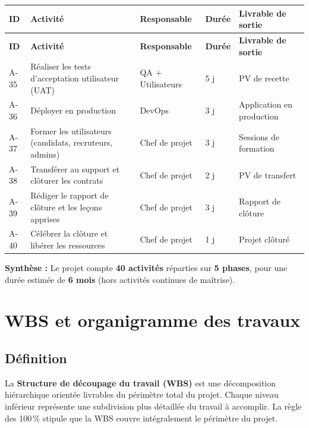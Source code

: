 \documentclass[11pt,a4paper]{article}
\begin{document}
\begin{longtable}{|p{1.2cm}|p{5.5cm}|p{2.2cm}|p{2cm}|p{2.5cm}|}
    \hline
    \rowcolor{ifrigray}
    \textbf{ID} & \textbf{Activité} & \textbf{Responsable} & \textbf{Durée} & \textbf{Livrable de sortie} \\
    \hline
    \endfirsthead
    \hline
    \rowcolor{ifrigray}
    \textbf{ID} & \textbf{Activité} & \textbf{Responsable} & \textbf{Durée} & \textbf{Livrable de sortie} \\
    \hline
    \endhead

    A-35 & Réaliser les tests d'acceptation utilisateur (UAT) & QA + Utilisateurs & 5 j & PV de recette \\
    \hline
    A-36 & Déployer en production & DevOps & 3 j & Application en production \\
    \hline
    A-37 & Former les utilisateurs (candidats, recruteurs, admins) & Chef de projet & 3 j & Sessions de formation \\
    \hline
    A-38 & Transférer au support et clôturer les contrats & Chef de projet & 2 j & PV de transfert \\
    \hline
    A-39 & Rédiger le rapport de clôture et les leçons apprises & Chef de projet & 3 j & Rapport de clôture \\
    \hline
    A-40 & Célébrer la clôture et libérer les ressources & Chef de projet & 1 j & Projet clôturé \\
    \hline
\end{longtable}

\noindent\textbf{Synthèse :} Le projet compte \textbf{40 activités} réparties sur \textbf{5 phases}, pour une durée estimée de \textbf{6 mois} (hors activités continues de maîtrise).

\section{WBS et organigramme des travaux}

\subsection{Définition}

La \textbf{Structure de découpage du travail (WBS)} est une décomposition hiérarchique orientée livrables du périmètre total du projet. Chaque niveau inférieur représente une subdivision plus détaillée du travail à accomplir. La règle des 100\,\% stipule que la WBS couvre intégralement le périmètre du projet.
\end{document}
